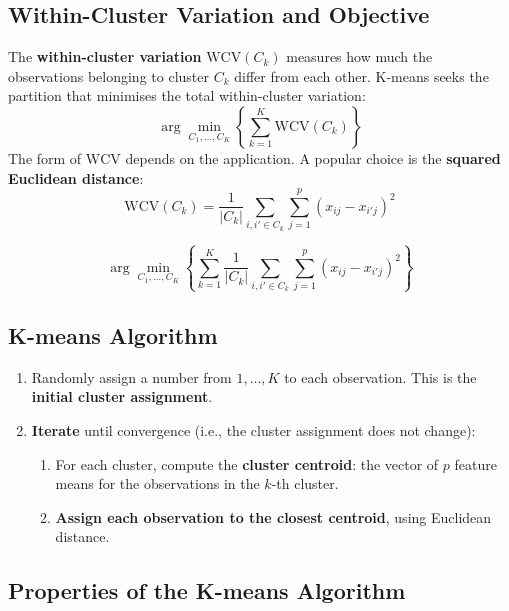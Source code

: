 \documentclass[11pt,a4paper]{article}
\theoremstyle{definition}
\theoremstyle{plain}
\theoremstyle{remark}
\begin{document}
\subsection{Within-Cluster Variation and Objective}

The \textbf{within-cluster variation} $\mathrm{WCV}(C_k)$ measures how much the observations belonging to cluster $C_k$ differ from each other. K-means seeks the partition that minimises the total within-cluster variation:
\[
    \arg\min_{C_1, \ldots, C_K} \left\{ \sum_{k=1}^{K} \mathrm{WCV}(C_k) \right\}
\]
The form of $\mathrm{WCV}$ depends on the application. A popular choice is the \textbf{squared Euclidean distance}:
\[
    \mathrm{WCV}(C_k) = \frac{1}{|C_k|} \sum_{i, i' \in C_k} \sum_{j=1}^{p} (x_{ij} - x_{i'j})^2
\]

\begin{tcolorbox}[colback=blue!5!white,colframe=blue!75!black,title=\textbf{K-means Objective}]
\[
    \arg\min_{C_1, \ldots, C_K} \left\{ \sum_{k=1}^{K} \frac{1}{|C_k|} \sum_{i, i' \in C_k} \sum_{j=1}^{p} (x_{ij} - x_{i'j})^2 \right\}
\]
\end{tcolorbox}

\subsection{K-means Algorithm}

\begin{tcolorbox}[colback=green!5!white,colframe=green!75!black,title=\textbf{K-means Algorithm}]
\begin{enumerate}
    \item Randomly assign a number from $1, \ldots, K$ to each observation. This is the \textbf{initial cluster assignment}.
    \item \textbf{Iterate} until convergence (i.e., the cluster assignment does not change):
    \begin{enumerate}
        \item For each cluster, compute the \textbf{cluster centroid}: the vector of $p$ feature means for the observations in the $k$-th cluster.
        \item \textbf{Assign each observation to the closest centroid}, using Euclidean distance.
    \end{enumerate}
\end{enumerate}
\end{tcolorbox}

\subsection{Properties of the K-means Algorithm}
\end{document}
